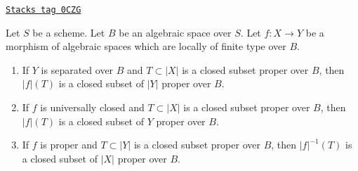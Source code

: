 \begin{lemma}
\label{spaces-perfect-lemma-functoriality-closed-proper-over-base}
\href{https://stacks.math.columbia.edu/tag/0CZG}{\texttt{Stacks tag 0CZG}}

Let $S$ be a scheme. Let $B$ be an algebraic space over $S$.
Let $f : X \to Y$ be a morphism of algebraic spaces which
are locally of finite type over $B$.
\begin{enumerate}
\item If $Y$ is separated over $B$ and $T \subset |X|$ is a closed subset
proper over $B$, then $|f|(T)$ is a closed subset of $|Y|$ proper over $B$.
\item If $f$ is universally closed and $T \subset |X|$ is a
closed subset proper over $B$, then $|f|(T)$ is a closed subset
of $Y$ proper over $B$.
\item If $f$ is proper and $T \subset |Y|$ is a closed subset
proper over $B$, then $|f|^{-1}(T)$ is a closed subset of $|X|$
proper over $B$.
\end{enumerate}
\end{lemma}

